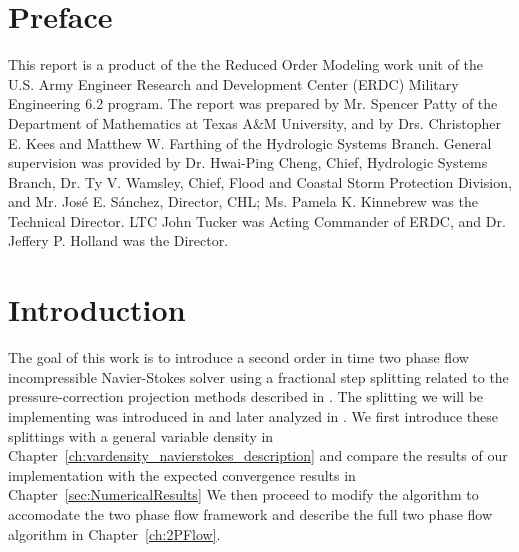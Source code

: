 \documentclass[letterpaper]{erdc}
\begin{document}



\maketitle
\setcounter{tocdepth}{1}
\tableofcontents

\listoffiguresandtables
%
\chapter{Preface}

This report is a product of the the Reduced Order Modeling work unit of the
U.S. Army Engineer Research and Development Center (ERDC) Military Engineering
6.2 program.  The report was prepared by Mr. Spencer Patty of the Department of
Mathematics at Texas A\&M University, and by Drs. Christopher E. Kees and
Matthew W. Farthing of the Hydrologic Systems Branch.
General supervision was
provided by Dr. Hwai-Ping Cheng, Chief, Hydrologic Systems Branch, Dr. Ty
V. Wamsley, Chief, Flood and Coastal Storm Protection Division, and Mr. 
Jos\'{e} E. S\'{a}nchez, Director, CHL; Ms. Pamela K. Kinnebrew was the 
Technical Director.  LTC John Tucker was Acting Commander of ERDC, and 
Dr. Jeffery P. Holland was the Director.

\mainmatter

\chapter{Introduction}

The goal of this work is to introduce a second order in time two phase flow incompressible Navier-Stokes solver using a fractional step splitting related to the pressure-correction projection methods described in \cite{guermond2006overview}.  The splitting we will be implementing was introduced in \cite{guermond2009splitting} and later analyzed in \cite{guermond2011error}.  We first introduce these splittings with a general variable density in Chapter~\ref{ch:vardensity_navierstokes_description} and compare the results of our implementation with the expected convergence results in Chapter~\ref{sec:NumericalResults}  We then proceed to modify the algorithm to accomodate the two phase flow framework and describe the full two phase flow
algorithm in Chapter~\ref{ch:2PFlow}.
\end{document}
